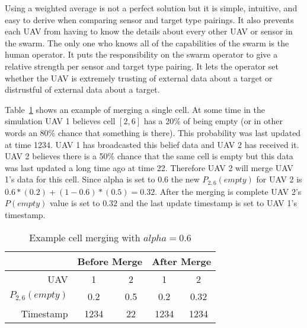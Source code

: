 \begin{multicols*}{2}

Using a weighted average is not a perfect solution but it is simple, intuitive, and easy to derive when comparing sensor and target type pairings.  It also prevents each UAV from having to know the details about every other UAV or sensor in the swarm.  The only one who knows all of the capabilities of the swarm is the human operator. It puts the responsibility on the swarm operator to give a relative strength per sensor and target type pairing.  It lets the operator set whether the UAV is extremely trusting of external data about a target or distrustful of external data about a target.

Table~\ref{tab:exampleCellMerge} shows an example of merging a single cell.  At some time in the simulation UAV 1 believes cell $[2, 6]$ has a 20\% of being empty (or in other words an 80\% chance that something is there). This probability was last updated at time 1234.  UAV 1 has broadcasted this belief data and UAV 2 has received it.  UAV 2 believes there is a 50\% chance that the same cell is empty but this data was last updated a long time ago at time 22.  Therefore UAV 2 will merge UAV 1's data for this cell.  Since alpha is set to 0.6 the new $P_{2,6}(empty)$ for UAV 2 is $0.6*(0.2) + (1-0.6)*(0.5)=0.32$.  After the merging is complete UAV 2's $P(empty)$ value is set to $0.32$ and the last update timestamp is set to UAV 1's timestamp.

\begin{table}[H]
	\caption{Example cell merging with $alpha=0.6$}
	\centering
	\label{tab:exampleCellMerge}
	\begin{tabular}{|r|c|c||c|c|}
		\hline
		& \multicolumn{2}{c||}{Before Merge} & \multicolumn{2}{c|}{After Merge} \\
		\hline
		UAV             & 1   & 2                            & 1   & 2 \\
		\hline
		$P_{2,6}(empty)$& 0.2 & 0.5                          & 0.2 & 0.32 \\
		\hline
		Timestamp       & 1234& 22                           & 1234& 1234 \\
		\hline
	\end{tabular}
\end{table}


\end{multicols*}

